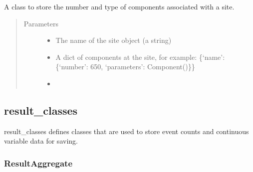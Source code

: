 \documentclass[letterpaper,10pt,english]{sphinxmanual}
\begin{document}
\begin{fulllineitems}
\label{\detokenize{index:feast.EmissionSimModules.infrastructure_classes.Site}}
A class to store the number and type of components associated with a site.
\begin{quote}\begin{description}
\item[{Parameters}] \leavevmode\begin{itemize}
\item {} 
 \textendash{} The name of the site object (a string)

\item {} 
 \textendash{} A dict of components at the site, for example:
\{‘name’: \{‘number’: 650, ‘parameters’: Component()\}\}

\item {} 
 \textendash{} 

\end{itemize}

\end{description}\end{quote}

\end{fulllineitems}



\subsection{result\_classes}
\label{\detokenize{index:module-feast.EmissionSimModules.result_classes}}\label{\detokenize{index:result-classes}}
result\_classes defines classes that are used to store event counts and continuous variable data for saving.


\subsubsection{ResultAggregate}
\label{\detokenize{index:resultaggregate}}
\end{document}
